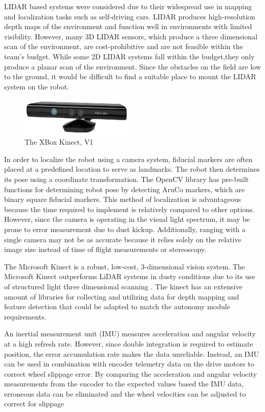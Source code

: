 \documentclass[class=article, crop=false]{standalone}
\begin{document}
	LIDAR based systems were considered due to their widespread use in mapping and localization tasks such as self-driving cars. LIDAR produces high-resolution depth maps of the environment and function  well in environments with limited visibility. However, many 3D LIDAR sensors, which produce a three dimensional scan of the environment, are cost-prohibitive and are not feasible within the team’s budget. While some 2D LIDAR systems fall within the budget,they only produce a planar scan of the environment. Since the obstacles on the field are low to the ground, it would be difficult to find a suitable place to mount the LIDAR system on the robot. 
	
	\begin{figure}
	\centering
	 \includegraphics[width=0.48\textwidth]{09_Figures/xbox-360-kinect.png}
	 \caption{The XBox Kinect, V1}
	 \label{fig:kinect-pic}
	\end{figure}
	
	In order to localize the robot using a camera system, fiducial markers are often placed at a predefined location to serve as landmarks. The robot then determines its pose using a coordinate transformation. The OpenCV library has pre-built functions for determining robot pose by detecting AruCo markers, which are binary square fiducial markers. This method of localization is advantageous because the time required to implement is relatively compared to other options. However, since the camera is operating in the visual light spectrum, it may be prone to error measurement due to dust kickup. Additionally, ranging with a single camera may not be as accurate because it relies solely on the relative image size instead of time of flight measurements or stereoscopy.
	
	The Microsoft Kinect is a robust, low-cost, 3-dimensional vision system. The Microsoft Kinect outperforms LiDAR systems in dusty conditions due to its use of structured light three dimensional scanning \cite{kinect}. The kinect has an extensive amount of libraries for collecting and utilizing data for depth mapping and feature detection that could be adapted to match the autonomy module requirements. 
	
	An inertial measurement unit (IMU) measures acceleration and angular velocity at a high refresh rate. However, since double integration is required to estimate position, the error accumulation rate makes the data unreliable. Instead, an IMU can be used in combination with encoder telemetry data on the drive motors to correct wheel slippage error. By comparing the acceleration and angular velocity measurements from the encoder to the expected values based the IMU data, erroneous data can be eliminated and the wheel velocities can be adjusted to correct for slippage
	
\end{document}

